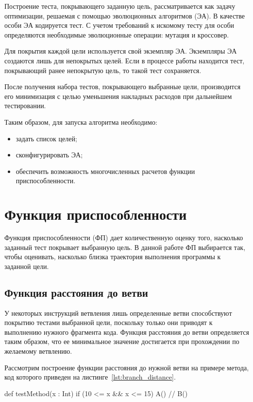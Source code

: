 Построение теста, покрывающего заданную цель, рассматривается как задачу оптимизации, решаемая с помощью эволюционных алгоритмов (ЭА). В качестве особи 
ЭА кодируется тест. С учетом требований к искомому тесту для особи определяются необходимые эволюционные операции: мутация и кроссовер. 

Для покрытия каждой цели используется свой экземпляр ЭА. Экземпляры ЭА создаются лишь для непокрытых целей. Если в процессе работы находится тест, 
покрывающий ранее непокрытую цель, то такой тест сохраняется.

После получения набора тестов, покрывающего выбранные цели, производится его минимизация с целью уменьшения накладных расходов при дальнейшем тестировании.

Таким образом, для запуска алгоритма необходимо:
\begin{itemize}
 \item задать список целей;
 \item сконфигурировать ЭА;
 \item обеспечить возможность многочисленных расчетов функции приспособленности.
\end{itemize}

\section{Функция приспособленности}
\label{sec:fitness_fun}
Функция приспособленности (ФП) дает количественную оценку того, насколько заданный тест покрывает выбранную цель. В данной работе ФП выбирается так, чтобы 
оценивать, насколько близка траектория выполнения программы к заданной цели.

\subsection{Функция расстояния до ветви}
\label{sec:branch_distance}
У некоторых инструкций ветвления лишь определенные ветви способствуют покрытию тестами выбранной цели, поскольку только они приводят к выполнению нужного 
фрагмента кода. Функция расстояния до ветви определяется таким образом, что ее минимальное значение достигается при прохождении по желаемому ветвлению.

Рассмотрим построение функции расстояния до нужной ветви на примере метода, код которого приведен на листинге~\ref{lst:branch_distance}.

\begin{snippet}[caption=Пример функции расстояния до ветви, label={lst:branch_distance}]
  def testMethod(x : Int) {
    if (10 <= x && x <= 15) {
      A()	// %
    }
    B()
  }
\end{snippet}

